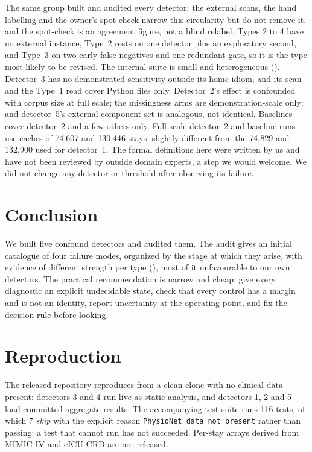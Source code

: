 \documentclass[pmlr,twocolumn,10pt]{jmlr}
\begin{document}
The same group built and audited every detector; the external scans, the
hand labelling and the owner's spot-check narrow this circularity but do not
remove it, and the spot-check is an agreement figure, not a blind relabel.
Types 2 to 4 have no external instance, Type~2 rests on one detector plus an
exploratory second, and Type~3 on two early false negatives and one redundant
gate, so it is the type most likely to be revised. The internal suite is small
and heterogeneous (). Detector~3 has no demonstrated
sensitivity outside its home idiom, and its scan and the Type~1 read cover
Python files only. Detector~2's effect is confounded with corpus size at full
scale; the missingness arms are demonstration-scale only; and detector~5's
external component set is analogous, not identical. Baselines cover detector~2
and a few others only. Full-scale detector~2 and baseline runs use caches of
74{,}607 and 130{,}446 stays, slightly different from the 74{,}829 and 132{,}900
used for detector~1. The formal definitions here were written by us and have not
been reviewed by outside domain experts, a step we would welcome. We did not
change any detector or threshold after observing its failure.

\section{Conclusion}
\label{sec:conclusion}

We built five confound detectors and audited them. The audit gives an initial
catalogue of four failure modes, organized by the stage at which they arise,
with evidence of different strength per type (), most of
it unfavourable to our own detectors. The practical recommendation is narrow and
cheap: give every diagnostic an explicit undecidable state, check that every
control has a margin and is not an identity, report uncertainty at the operating
point, and fix the decision rule before looking.




\appendix

\section{Reproduction}\label{apd:repro}

The released repository reproduces  from a clean clone with
no clinical data present: detectors 3 and 4 run live as static analysis, and
detectors 1, 2 and 5 load committed aggregate results. The accompanying test
suite runs 116 tests, of which 7 \emph{skip} with the explicit reason
\texttt{PhysioNet data not present} rather than passing: a test that cannot run
has not succeeded. Per-stay arrays derived from MIMIC-IV and eICU-CRD are not
released.
\end{document}
